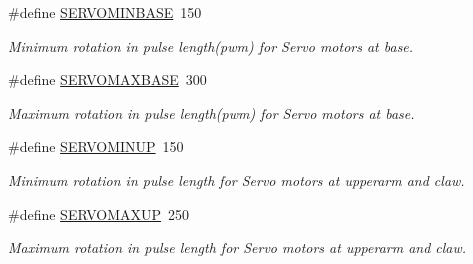 \begin{DoxyCompactItemize}
\item 
\hypertarget{_final___demo___code_8ino_ae3250e9bc1afb606a99abad6ff44da46}{\#define \hyperlink{_final___demo___code_8ino_ae3250e9bc1afb606a99abad6ff44da46}{S\-E\-R\-V\-O\-M\-I\-N\-B\-A\-S\-E}~150}\label{_final___demo___code_8ino_ae3250e9bc1afb606a99abad6ff44da46}

\begin{DoxyCompactList}\small\item\em Minimum rotation in pulse length(pwm) for Servo motors at base. \end{DoxyCompactList}\item 
\hypertarget{_final___demo___code_8ino_a9524d9255f4670136e1f56a03ed2337a}{\#define \hyperlink{_final___demo___code_8ino_a9524d9255f4670136e1f56a03ed2337a}{S\-E\-R\-V\-O\-M\-A\-X\-B\-A\-S\-E}~300}\label{_final___demo___code_8ino_a9524d9255f4670136e1f56a03ed2337a}

\begin{DoxyCompactList}\small\item\em Maximum rotation in pulse length(pwm) for Servo motors at base. \end{DoxyCompactList}\item 
\hypertarget{_final___demo___code_8ino_a9a8c5ba1c99c5777d9bc75eb786d67e5}{\#define \hyperlink{_final___demo___code_8ino_a9a8c5ba1c99c5777d9bc75eb786d67e5}{S\-E\-R\-V\-O\-M\-I\-N\-U\-P}~150}\label{_final___demo___code_8ino_a9a8c5ba1c99c5777d9bc75eb786d67e5}

\begin{DoxyCompactList}\small\item\em Minimum rotation in pulse length for Servo motors at upperarm and claw. \end{DoxyCompactList}\item 
\hypertarget{_final___demo___code_8ino_a1050c210d8a8e13e250166de25133129}{\#define \hyperlink{_final___demo___code_8ino_a1050c210d8a8e13e250166de25133129}{S\-E\-R\-V\-O\-M\-A\-X\-U\-P}~250}\label{_final___demo___code_8ino_a1050c210d8a8e13e250166de25133129}

\begin{DoxyCompactList}\small\item\em Maximum rotation in pulse length for Servo motors at upperarm and claw. \end{DoxyCompactList}\end{DoxyCompactItemize}
